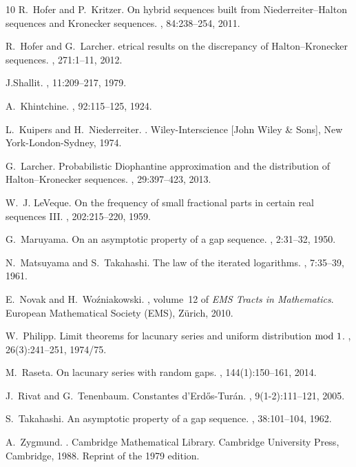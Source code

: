 \documentclass[12pt]{amsart}
\begin{document}
\begin{thebibliography}{10}
R.~Hofer and P.~Kritzer.
\newblock On hybrid sequences built from {N}iederreiter--{H}alton sequences and
  {K}ronecker sequences.
, 84:238--254, 2011.

R.~Hofer and G.~Larcher.
etrical results on the discrepancy of {H}alton--{K}ronecker
  sequences.
, 271:1--11, 2012.

J.{Shallit}.
, 11:209--217, 1979.

A.~{Khintchine}.
, 92:115--125, 1924.

L.~Kuipers and H.~Niederreiter.
.
\newblock Wiley-Interscience [John Wiley \& Sons], New York-London-Sydney,
  1974.

G.~Larcher.
\newblock Probabilistic {D}iophantine approximation and the distribution of
  {H}alton--{K}ronecker sequences.
, 29:397--423, 2013.

W.~J. LeVeque.
\newblock On the frequency of small fractional parts in certain real sequences
  {I}{I}{I}.
, 202:215--220, 1959.

G.~Maruyama.
\newblock On an asymptotic property of a gap sequence.
, 2:31--32, 1950.

N.~Matsuyama and S.~Takahashi.
\newblock The law of the iterated logarithms.
, 7:35--39, 1961.

E.~Novak and H.~Wo{\'z}niakowski.
, volume~12 of {\em EMS Tracts in Mathematics}.
\newblock European Mathematical Society (EMS), Z\"urich, 2010.

W.~Philipp.
\newblock Limit theorems for lacunary series and uniform distribution {${\rm
  mod}\ 1$}.
, 26(3):241--251, 1974/75.

M.~Raseta.
\newblock On lacunary series with random gaps.
, 144(1):150--161, 2014.

J.~Rivat and G.~Tenenbaum.
\newblock Constantes d'{E}rd{\H o}s-{T}ur\'an.
, 9(1-2):111--121, 2005.

S.~Takahashi.
\newblock An asymptotic property of a gap sequence.
, 38:101--104, 1962.

A.~Zygmund.
.
\newblock Cambridge Mathematical Library. Cambridge University Press,
  Cambridge, 1988.
\newblock Reprint of the 1979 edition.

\end{thebibliography}
\end{document}
